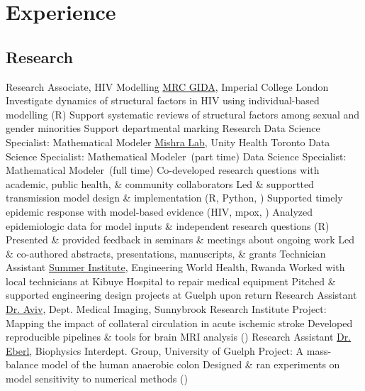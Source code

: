 \section{Experience}\twodate
\subsection{Research}
  {Research Associate, HIV Modelling}
  {\href{https://www.imperial.ac.uk/mrc-global-infectious-disease-analysis}{MRC GIDA}, Imperial College London}
  \bullet Investigate dynamics of structural factors in HIV using individual-based modelling (R)
  \bullet Support systematic reviews of structural factors among sexual and gender minorities
  \bullet Support departmental marking
  {Research Data Science Specialist: Mathematical Modeler}
  {\href{http://mishra-lab.ca}{Mishra Lab}, Unity Health Toronto}
  {Data Science Specialist: Mathematical Modeler~\textnormal{(part time)}}{}
  {Data Science Specialist: Mathematical Modeler~\textnormal{(full time)}}{}
  \bullet Co-developed research questions with academic, public health, \& community collaborators
  \bullet Led \& supportted transmission model design \& implementation (R, Python, \matlab)
  \bullet Supported timely epidemic response with model-based evidence (HIV, mpox, \covid)
  \bullet Analyzed epidemiologic data for model inputs \& independent research questions (R)
  \bullet Presented \& provided feedback in seminars \& meetings about ongoing work
  \bullet Led \& co-authored abstracts, presentations, manuscripts, \& grants
  {Technician Assistant}
  {\href{https://www.ewh.org/the-institutes/summer-institute-programs}{Summer Institute}, Engineering World Health, Rwanda}
  \bullet Worked with local technicians at Kibuye Hospital to repair medical equipment
  \bullet Pitched \& supported engineering design projects at Guelph upon return
  {Research Assistant}
  {\href{https://www.uottawa.ca/brain/people/aviv-richard}{Dr. Aviv}, Dept. Medical Imaging, Sunnybrook Research Institute}
  \bullet Project: Mapping the impact of collateral circulation in acute ischemic stroke
  \bullet Developed reproducible pipelines \& tools for brain MRI analysis (\matlab)
  {Research Assistant}
  {\href{https://www.heberl.uoguelph.ca}{Dr. Eberl}, Biophysics Interdept. Group, University of Guelph}
  \bullet Project: A mass-balance model of the human anaerobic colon
  \bullet Designed \& ran experiments on model sensitivity to numerical methods (\matlab)
\clearpage %
